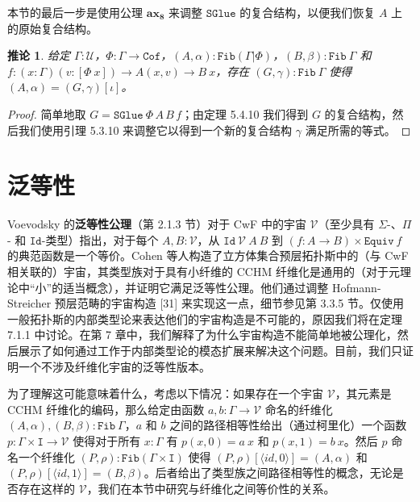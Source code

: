 \documentclass{ctexrep}
\theoremstyle{plain}
\newtheorem{corollary}[theorem]{推论}
\theoremstyle{definition}
\theoremstyle{remark}
\newcommand\ttI{\mathtt{I}}
\newcommand{\ax}[1]{\mathbf{ax_{#1}}}
\begin{document}
本节的最后一步是使用公理 $\ax{8}$ 来调整 $\mathtt{SGlue}$ 的复合结构，以便我们恢复 $A$ 上的原始复合结构。

\begin{corollary}
给定 $\Gamma : \mathcal{U}$，$\Phi : \Gamma \to \mathtt{Cof}$，$(A, \alpha) : \mathtt{Fib}(\Gamma|\Phi)$，$(B, \beta) : \mathtt{Fib}\ \Gamma$ 和 $f : (x : \Gamma)(v : [\Phi\ x]) \to A(x, v) \to B\ x$，存在 $(G, \gamma) : \mathtt{Fib}\ \Gamma$ 使得 $(A, \alpha) = (G, \gamma)[\iota]$。
\end{corollary}

\begin{proof}
简单地取 $G = \mathtt{SGlue}\ \Phi\,A\,B\,f$；由定理 5.4.10 我们得到 $G$ 的复合结构，然后我们使用引理 5.3.10 来调整它以得到一个新的复合结构 $\gamma$ 满足所需的等式。
\end{proof}

\section{泛等性}

Voevodsky 的\textbf{泛等性公理}（第 2.1.3 节）对于 CwF 中的宇宙 $\mathcal{V}$（至少具有 $\Sigma$-、$\Pi$- 和 $\mathtt{Id}$-类型）指出，对于每个 $A, B : \mathcal{V}$，从 $\mathtt{Id}\ \mathcal{V}\ A\ B$ 到 $(f : A \to B) \times \mathtt{Equiv}\ f$ 的典范函数是一个等价。Cohen 等人构造了立方体集合预层拓扑斯中的（与 CwF 相关联的）宇宙，其类型族对于具有小纤维的 CCHM 纤维化是通用的（对于元理论中``小''的适当概念），并证明它满足泛等性公理。他们通过调整 Hofmann-Streicher 预层范畴的宇宙构造 [31] 来实现这一点，细节参见第 3.3.5 节。仅使用一般拓扑斯的内部类型论来表达他们的宇宙构造是不可能的，原因我们将在定理 7.1.1 中讨论。在第 7 章中，我们解释了为什么宇宙构造不能简单地被公理化，然后展示了如何通过工作于内部类型论的模态扩展来解决这个问题。目前，我们只证明一个不涉及纤维化宇宙的泛等性版本。

为了理解这可能意味着什么，考虑以下情况：如果存在一个宇宙 $\mathcal{V}$，其元素是 CCHM 纤维化的编码，那么给定由函数 $a, b : \Gamma \to \mathcal{V}$ 命名的纤维化 $(A, \alpha), (B, \beta) : \mathtt{Fib}\ \Gamma$，$a$ 和 $b$ 之间的路径相等性给出（通过柯里化）一个函数 $p : \Gamma \times \ttI \to \mathcal{V}$ 使得对于所有 $x : \Gamma$ 有 $p(x, 0) = a\ x$ 和 $p(x, 1) = b\ x$。然后 $p$ 命名一个纤维化 $(P, \rho) : \mathtt{Fib}(\Gamma \times \ttI)$ 使得 $(P, \rho)[\langle  id , 0\rangle] = (A, \alpha)$ 和 $(P, \rho)[\langle  id , 1\rangle] = (B, \beta)$。后者给出了类型族之间路径相等性的概念，无论是否存在这样的 $\mathcal{V}$，我们在本节中研究与纤维化之间等价性的关系。
\end{document}
